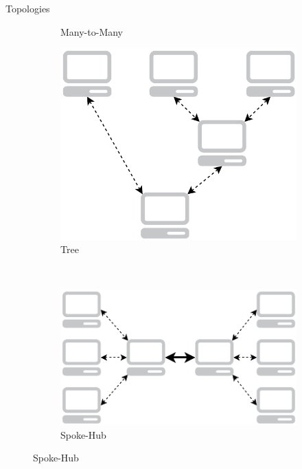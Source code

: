 \documentclass[first=red,second=purple,logo=yellowexc]{aaltoslides}
\begin{document}
\begin{frame}{Topologies}
\begin{figure}[h]
\begin{subfigure}[b]{0.3\textwidth}
                 \caption{Many-to-Many}
        \end{subfigure}
        \begin{subfigure}[b]{0.3\textwidth}
                \centering
                \includegraphics[width=\textwidth]{three.pdf}
                \caption{Tree}
        \end{subfigure}%
        ~ %
        \begin{subfigure}[b]{0.3\textwidth}
                \centering
                \includegraphics[width=\textwidth]{hubandspoke.pdf}
                 \caption{Spoke-Hub}
        \end{subfigure}
\end{figure}
\end{frame}
\end{document}
